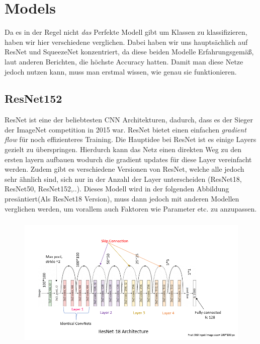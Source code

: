 \section{Models}
\label{ch:models}

Da es in der Regel nicht \textit{das} Perfekte Modell gibt um Klassen zu klassifizieren, haben wir hier verschiedene verglichen. Dabei haben wir uns hauptsächlich auf ResNet und SqueezeNet konzentriert, da diese beiden Modelle Erfahrungsgemäß, laut anderen Berichten, die höchste Accuracy hatten.
Damit man diese Netze jedoch nutzen kann, muss man erstmal wissen, wie genau sie funktionieren.

\subsection{ResNet152}

ResNet ist eine der beliebtesten CNN Architekturen, dadurch, dass es der Sieger der ImageNet competition in 2015 war. ResNet bietet einen einfachen \textit{gradient flow} für noch effizienteres Training.
\newline Die Hauptidee bei ResNet ist es einige Layers gezielt zu überspringen. Hierdurch kann das Netz einen direkten Weg zu den ersten layern aufbauen wodurch die gradient updates für diese Layer vereinfacht werden. Zudem gibt es verschiedene Versionen von ResNet, welche alle jedoch sehr ähnlich sind, sich nur in der Anzahl der Layer unterscheiden (ResNet18, ResNet50, ResNet152,..).
Dieses Modell wird in der folgenden Abbildung presäntiert(Als ResNet18 Version), muss dann jedoch mit anderen Modellen verglichen werden, um vorallem auch Faktoren wie Parameter etc. zu anzupassen.

\subsubsection*{}
\begin{figure}[h]
    \centering
    \includegraphics[width=1.1\textwidth]{Bilder/ResNet18Model.png}
    \caption{}
    \label{fig:ResNet18}
\end{figure}

